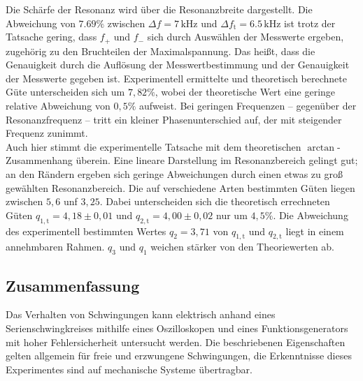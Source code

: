 Die Schärfe der Resonanz wird über die Resonanzbreite dargestellt. 
Die Abweichung von $7.69\%$ zwischen $\Delta{f}=7\,\si{\kilo\hertz}$ und $\Delta{f_\mathup{t}}=6.5\,\si{\kilo\hertz}$ 
ist  trotz der Tatsache gering, dass $f_+$ und $f_-$ sich durch Auswählen der Messwerte ergeben, zugehörig zu den Bruchteilen der Maximalspannung. 
Das heißt, dass die Genauigkeit durch die Auflösung der Messwertbestimmung und der Genauigkeit der Messwerte gegeben ist. Experimentell ermittelte und theoretisch berechnete Güte unterscheiden sich um $7,82\%$, wobei der theoretische Wert eine geringe relative Abweichung von $0,5\%$ aufweist.
Bei geringen Frequenzen -- gegenüber der Resonanzfrequenz -- tritt ein kleiner Phasenunterschied auf, der mit steigender Frequenz zunimmt. \\
Auch hier stimmt die experimentelle Tatsache mit dem theoretischen $\arctan$-Zusammenhang überein. 
Eine lineare Darstellung im Resonanzbereich gelingt gut; 
an den Rändern ergeben sich geringe Abweichungen durch einen etwas zu groß gewählten Resonanzbereich.
Die auf verschiedene Arten bestimmten Güten liegen zwischen $5,6$ unf $3,25$. Dabei unterscheiden sich die theoretisch errechneten Güten $q_{1,\mathup{t}}=4,18\pm0,01$ und $q_{2,\mathup{t}}=4,00\pm0,02$ nur um $4,5\%$. Die Abweichung des experimentell bestimmten Wertes $q_2=3,71$ von  $q_{1,\mathup{t}}$ und  $q_{2,\mathup{t}}$ liegt in einem annehmbaren Rahmen. $q_3$ und $q_1$ weichen stärker von den Theoriewerten ab.

\subsection{Zusammenfassung}
Das Verhalten von Schwingungen kann elektrisch anhand eines Serienschwingkreises mithilfe eines Oszilloskopen und eines Funktionsgenerators mit hoher Fehlersicherheit untersucht werden.
Die beschriebenen Eigenschaften gelten allgemein für freie und erzwungene Schwingungen, die Erkenntnisse dieses Experimentes sind auf mechanische Systeme übertragbar.
